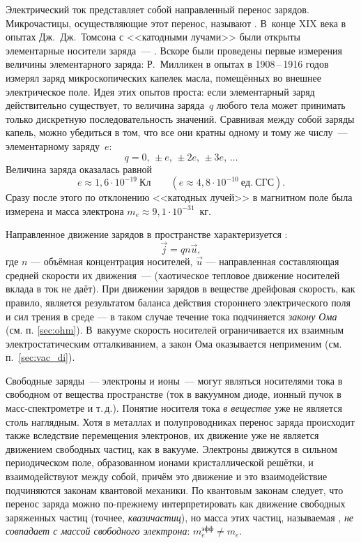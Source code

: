 Электрический ток представляет собой направленный перенос зарядов. Микрочастицы,
осуществляющие этот перенос, называют \mbox{}. В~конце
XIX века в опытах Дж.~Дж.~Томсона с <<катодными лучами>> были открыты
элементарные носители заряда~--- . Вскоре были проведены
первые измерения величины элементарного заряда: Р.~Милликен
в опытах в 1908\,--\,1916 годов измерял заряд микроскопических капелек масла,
помещённых во внешнее электрическое поле. Идея этих опытов проста:
если элементарный заряд действительно существует, то величина заряда~$q$
любого тела может принимать только дискретную последовательность значений.
Сравнивая между собой заряды капель, можно убедиться в том, что все они
кратны одному и тому же числу~--- элементарному заряду~$e$:
\begin{equation*}
    q = 0,\,\pm e,\,\pm2e,\,\pm3e,\, \ldots
\end{equation*}
Величина заряда оказалась равной
\[
e\approx1,6\cdot 10^{-19}~Кл\qquad (e\approx 4,8\cdot 10^{-10}~ед.~СГС).
\]
Сразу после этого по отклонению <<катодных лучей>> в магнитном поле была
измерена и масса электрона $m_e\approx 9,1\cdot 10^{-31}$~кг.

Направленное движение зарядов в пространстве характеризуется 
:
\begin{equation}
\vec{j} = q n \vec{u},
\end{equation}
где $n$ --- объёмная концентрация носителей, $\vec{u}$ --- направленная составляющая 
средней скорости их движения~---  (хаотическое тепловое
движение носителей вклада в ток не даёт). При движении зарядов в веществе
дрейфовая скорость, как правило, является результатом баланса действия 
стороннего электрического поля и сил трения в среде --- в таком
случае течение тока подчиняется \emph{закону Ома} (см. п. \ref{sec:ohm}).
В~вакууме скорость носителей ограничивается их взаимным электростатическим
отталкиванием, а закон Ома оказывается неприменим (см. п.~\ref{sec:vac_di}).

Свободные заряды~--- электроны и ионы~--- могут являться носителями тока 
в свободном от вещества пространстве (ток в вакуумном диоде, 
ионный пучок в масс-спектрометре и т.\,д.). Понятие носителя тока \emph{в веществе} уже не является столь
наглядным. Хотя в металлах и полупроводниках перенос заряда происходит
также вследствие перемещения электронов, их движение уже не является
движением свободных частиц, как в вакууме. Электроны движутся в сильном
периодическом поле, образованном ионами кристаллической решётки, и
взаимодействуют между собой, причём это движение и это взаимодействие
подчиняются законам квантовой механики. По квантовым законам следует, что перенос
заряда можно по-прежнему интерпретировать как движение свободных заряженных
частиц (точнее, \emph{квазичастиц}), но масса этих частиц, называемая
, \emph{не совпадает с массой свободного
электрона}: $m_{e}^{эфф}\ne m_e$.

